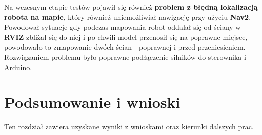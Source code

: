 \documentclass[a4paper,twoside,12pt]{book}
\begin{document}
Na wczesnym etapie testów pojawił się również \textbf{problem z błędną lokalizacją robota na mapie}, który również uniemożliwiał nawigację przy użyciu \textbf{Nav2}. Powodował sytuacje gdy podczas mapowania robot oddalał się od ściany w \textbf{RVIZ} zbliżał się do niej i po chwili model przenosił się na poprawne miejsce, powodowało to zmapowanie dwóch ścian - poprawnej i przed przeniesieniem. Rozwiązaniem problemu było poprawne podłączenie silników do sterownika i Arduino.






\chapter{Podsumowanie i wnioski}
Ten rozdział zawiera uzyskane wyniki z wnioskami oraz kierunki dalszych prac.
\end{document}
